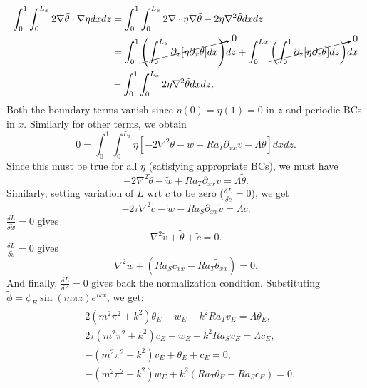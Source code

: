 \documentclass{article}
\newcommand{\grad}[1]{\nabla{#1}}
\newcommand{\deldot}[1]{\nabla \cdot{#1}}
\newcommand{\lap}[1]{\nabla^{2}{#1}}
\begin{document}
\begin{align}
 \begin{split}
 \int_{0}^{1} \int_{0}^{L_{x}}2\grad{\tilde{\theta}} \cdot \grad{\eta} dxdz & = \int_{0}^{1} \int_{0}^{L_{x}} 2 \deldot{\eta \grad{\tilde{\theta}}} - 2 \eta \lap{\tilde{\theta}} dx dz\\
 & = \int_{0}^{1}\cancelto{0}{\left(\int_{0}^{L_{x}}\partial_{x}[\eta \partial_{x}\tilde{\theta}] dx \right) }dz + \int_{0}^{Lx} \cancelto{0}{\left(\int_{0}^{1}\partial_{z}[\eta \partial_{z}\tilde{\theta}] dz\right)} dx \\
 & - \int_{0}^{1} \int_{0}^{L_{x}}2 \eta \lap{\tilde{\theta}} dx dz, 
  \end{split}
\end{align}
Both the boundary terms vanish since $\eta (0) = \eta(1) = 0$ in $z$ and periodic BCs in $x$. Similarly for other terms, we obtain
\begin{equation}
 0 = \int_{0}^{1} \int_{0}^{L_{x}}\eta \left[-2\lap{\tilde{\theta}} - \tilde{w} + Ra_{T} \partial_{xx} v  - \Lambda \tilde{\theta} \right]dxdz.
\end{equation}
Since this must be true for all $\eta$ (satisfying appropriate BCs), we must have
\begin{equation}
 \boxed{-2\lap{\tilde{\theta}} - \tilde{w} + Ra_{T} \partial_{xx} v = \Lambda \tilde{\theta}}.
\end{equation}
%
Similarly, setting variation of $L$ wrt $\tilde{c}$ to be zero ($\frac{\delta L}{\delta \tilde{c}} = 0$), we get
\begin{equation}
 \boxed{-2\tau \lap{\tilde{c}} - \tilde{w} - Ra_{S} \partial_{xx} \tilde{v} = \Lambda \tilde{c}}.
\end{equation}
%
$\frac{\delta L}{\delta \tilde{w}} = 0$ gives
\begin{equation}
 \boxed{\lap{\tilde{v}} + \tilde{\theta} + \tilde{c} = 0}.
\end{equation}
%
$\frac{\delta L}{\delta \tilde{v}} = 0$ gives
\begin{equation}
 \boxed{\lap{\tilde{w}} + (Ra_{S}\tilde{c}_{xx} - Ra_{T}\tilde{\theta}_{xx}) = 0. } 
\end{equation}
And finally, $\frac{\delta L}{\delta \Lambda} = 0$ gives back the normalization condition. 
Substituting $\tilde{\phi} = \phi_{E} \sin({m\pi z}) e^{ikx}$, we get:
\begin{align}
 \begin{split}
  & 2 (m^{2}\pi^{2} + k^{2}) \theta_{E} - w_{E} - k^{2}Ra_{T} v_{E} = \Lambda \theta_{E}, \\
  & 2 \tau (m^{2}\pi^{2} + k^{2}) c_{E} - w_{E} + k^{2}Ra_{S} v_{E} = \Lambda c_{E}, \\
  & -(m^{2}\pi^{2} + k^{2}) v_{E} + \theta_{E} + c_{E} = 0,\\
  &-(m^{2}\pi^{2} + k^{2}) w_{E} + k^{2}(Ra_{T} \theta_{E} - Ra_{S}c_{E}) = 0.
 \end{split}
\end{align}
\end{document}
